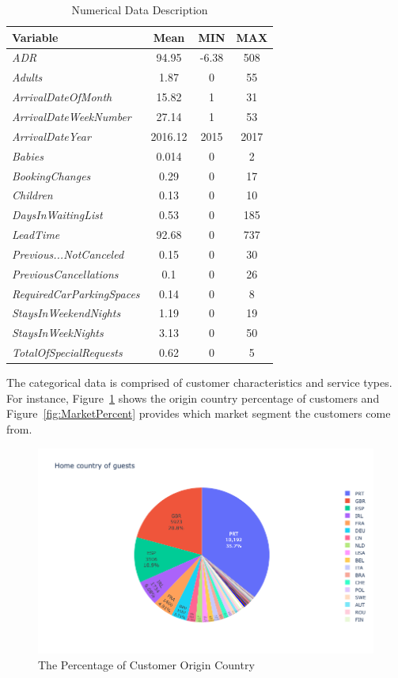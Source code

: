 \documentclass[10pt,twocolumn,letterpaper]{article}
\begin{document}
\begin{table}[ht]
\begin{center}
\begin{tabular}{|p{3.8cm}|c|c|c|}
\hline Variable & Mean & MIN & MAX \\ \hline 
\emph{ADR} & 94.95 & -6.38 & 508 \\
\emph{Adults} & 1.87 & 0 & 55 \\
\emph{ArrivalDateOfMonth} & 15.82 & 1 & 31 \\
\emph{ArrivalDateWeekNumber} & 27.14 & 1 & 53 \\
\emph{ArrivalDateYear} & 2016.12 & 2015 & 2017 \\
\emph{Babies} & 0.014 & 0 & 2 \\
\emph{BookingChanges} & 0.29 & 0 & 17 \\
\emph{Children} & 0.13 & 0 & 10 \\
\emph{DaysInWaitingList} & 0.53 & 0 & 185 \\
\emph{LeadTime} & 92.68 & 0 & 737 \\
\emph{Previous...NotCanceled} & 0.15 & 0 & 30 \\
\emph{PreviousCancellations} & 0.1 & 0 & 26 \\
\emph{RequiredCarParkingSpaces} & 0.14 & 0 & 8 \\
\emph{StaysInWeekendNights} & 1.19 & 0 & 19 \\
\emph{StaysInWeekNights} & 3.13 & 0 & 50 \\
\emph{TotalOfSpecialRequests} & 0.62 & 0 & 5 \\
\hline
\end{tabular}
\end{center}
\caption{\label{tab:NumDescrip} Numerical Data Description}
\end{table}


The categorical data is comprised of customer characteristics and service types. For instance, Figure~\ref{fig:CountryPercent} shows the origin country percentage of customers and Figure~\ref{fig:MarketPercent} provides which market segment the customers come from.


\begin{figure}[ht]
\begin{center}
    \includegraphics[width=0.8\linewidth]{images/Country_Percentage.png}
\end{center}
   \caption{The Percentage of Customer Origin Country}
\label{fig:CountryPercent}
\end{figure}
\end{document}
